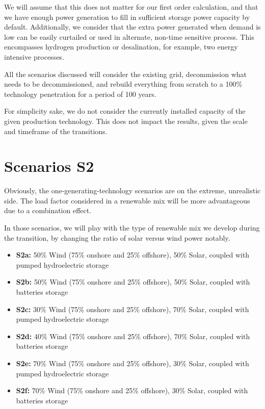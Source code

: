 We will assume that this does not matter for our first order calculation, and that we have enough power generation to fill in sufficient storage power capacity by default. Additionally, we consider that the extra power generated when demand is low can be easily curtailed or used in alternate, non-time sensitive process. This encompasses hydrogen production or desalination, for example, two energy intensive processes.

All the scenarios discussed will consider the existing grid, decommission what needs to be decommissioned, and rebuild everything from scratch to a 100\% technology penetration for a period of 100 years.

For simplicity sake, we do not consider the currently installed capacity of the given production technology. This does not impact the results, given the scale and timeframe of the transitions.


\section{Scenarios S2}

Obviously, the one-generating-technology scenarios are on the extreme, unrealistic side. The load factor considered in a renewable mix will be more advantageous due to a combination effect.

In those scenarios, we will play with the type of renewable mix we develop during the transition, by changing the ratio of solar versus wind power notably.


\begin{kaobox}[frametitle=S2 scenarios]
\begin{itemize}
	\item \textbf{S2a:} 50\% Wind (75\% onshore and 25\% offshore), 50\% Solar, coupled with pumped hydroelectric storage
	\item \textbf{S2b:} 50\% Wind (75\% onshore and 25\% offshore), 50\% Solar, coupled with batteries storage
	\item \textbf{S2c:} 30\% Wind (75\% onshore and 25\% offshore), 70\% Solar, coupled with pumped hydroelectric storage
	\item \textbf{S2d:} 40\% Wind (75\% onshore and 25\% offshore), 70\% Solar, coupled with batteries storage
	\item \textbf{S2e:} 70\% Wind (75\% onshore and 25\% offshore), 30\% Solar, coupled with pumped hydroelectric storage
	\item \textbf{S2f:} 70\% Wind (75\% onshore and 25\% offshore), 30\% Solar, coupled with batteries storage
\end{itemize}
\end{kaobox}


